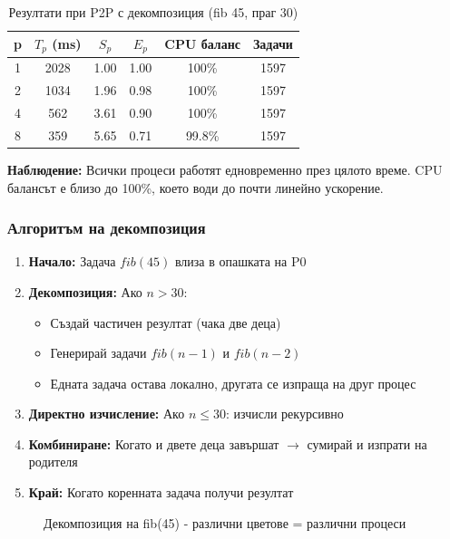 \documentclass[12pt,a4paper]{article}
\begin{document}
\begin{table}[H]
\centering
\begin{tabular}{cccccc}
\toprule
\textbf{p} & \textbf{$T_p$ (ms)} & \textbf{$S_p$} & \textbf{$E_p$} & \textbf{CPU баланс} & \textbf{Задачи} \\
\midrule
1 & 2028 & 1.00 & 1.00 & 100\% & 1597 \\
2 & 1034 & 1.96 & 0.98 & 100\% & 1597 \\
4 & 562 & 3.61 & 0.90 & 100\% & 1597 \\
8 & 359 & 5.65 & 0.71 & 99.8\% & 1597 \\
\bottomrule
\end{tabular}
\caption{Резултати при P2P с декомпозиция (fib 45, праг 30)}
\end{table}

\textbf{Наблюдение:} Всички процеси работят едновременно през цялото време. CPU балансът е близо до 100\%, което води до почти линейно ускорение.

\subsubsection{Алгоритъм на декомпозиция}

\begin{enumerate}
    \item \textbf{Начало:} Задача $fib(45)$ влиза в опашката на P0
    \item \textbf{Декомпозиция:} Ако $n > 30$:
    \begin{itemize}
        \item Създай частичен резултат (чака две деца)
        \item Генерирай задачи $fib(n-1)$ и $fib(n-2)$
        \item Едната задача остава локално, другата се изпраща на друг процес
    \end{itemize}
    \item \textbf{Директно изчисление:} Ако $n \leq 30$: изчисли рекурсивно
    \item \textbf{Комбиниране:} Когато и двете деца завършат $\rightarrow$ сумирай и изпрати на родителя
    \item \textbf{Край:} Когато коренната задача получи резултат
\end{enumerate}

\begin{figure}[H]
\centering
{}
\caption{Декомпозиция на fib(45) - различни цветове = различни процеси}
\end{figure}
\end{document}
